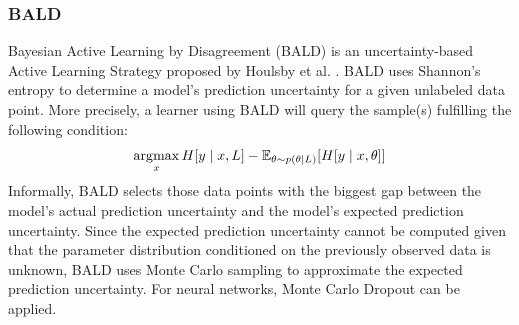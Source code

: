 \subsubsection{BALD}
Bayesian Active Learning by Disagreement (BALD) is an uncertainty-based Active Learning Strategy proposed by Houlsby et al. \cite{houlsby2011bayesian}. BALD uses Shannon's entropy \cite{cover1991information}
to determine a model's prediction uncertainty for a given unlabeled data point. More precisely, a learner using  BALD will query the sample(s) fulfilling the following condition:
\begin{equation}
    \operatorname*{\arg\!\max}_x H[y \mid x, L] - \mathbb{E}_{\theta \sim p(\theta \mid L)} [H[y \mid x, \theta]]
\end{equation}
Informally, BALD selects those data points with the biggest gap between the model's actual prediction uncertainty and the model's expected prediction uncertainty. Since the expected prediction uncertainty cannot
be computed given that the parameter distribution conditioned on the previously observed data is unknown, BALD uses Monte Carlo sampling to approximate the expected prediction uncertainty. For neural networks, Monte
Carlo Dropout \cite{gal2016dropout} can be applied.
